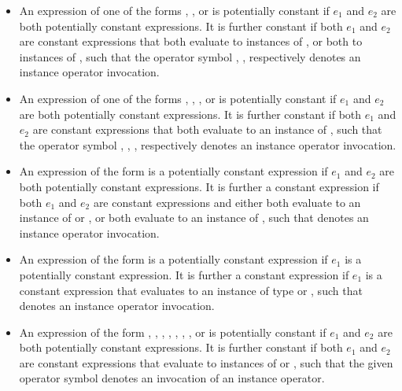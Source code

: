 \documentclass[makeidx]{article}
\begin{document}
{\begin{itemize}
\item An expression of one of the forms ,
  , or  is potentially constant
  if $e_1$ and $e_2$ are both potentially constant expressions.
  It is further constant if both $e_1$ and $e_2$ are constant expressions that
  both evaluate to instances of ,
  or both to instances of ,
  such that the operator symbol
  \lit{\&}, \lit{|}, respectively \lit{\^}
  denotes an instance operator invocation.

\item An expression of one of the forms ,
  , ,
  or  is potentially constant
  if $e_1$ and $e_2$ are both potentially constant expressions.
  It is further constant if both $e_1$ and $e_2$ are constant expressions that
  both evaluate to an instance of ,
  such that the operator symbol
  \lit{\gtilde{}/}, \lit{\gtgt}, \lit{\gtgtgt}, respectively \lit{\ltlt}
  denotes an instance operator invocation.

\item An expression of the form  is
  a potentially constant expression if $e_1$ and $e_2$
  are both potentially constant expressions.
  It is further a constant expression
  if both $e_1$ and $e_2$ are constant expressions
  and either both evaluate to an instance of  or ,
  or both evaluate to an instance of ,
  such that \lit{+} denotes an instance operator invocation.

\item
  An expression of the form  is a potentially constant expression
  if $e_1$ is a potentially constant expression.
  It is further a constant expression if $e_1$ is a constant expression that
  evaluates to an instance of type  or ,
  such that \lit{-} denotes an instance operator invocation.

\item An expression of the form , ,
  , , ,
  , , or 
  is potentially constant
  if $e_1$ and $e_2$ are both potentially constant expressions.
  It is further constant if both $e_1$ and $e_2$ are constant expressions that
  evaluate to instances of  or ,
  such that the given operator symbol denotes
  an invocation of an instance operator.


\end{itemize}}
\end{document}
